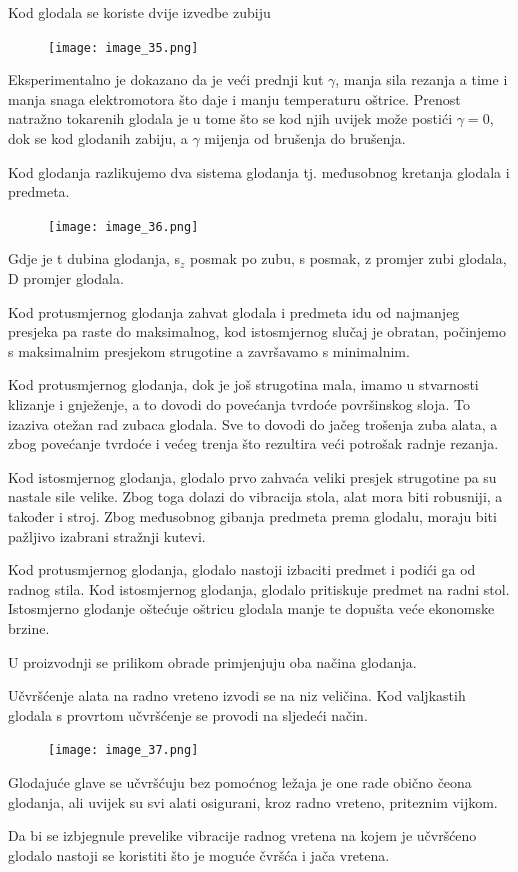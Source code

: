 \documentclass[a4paper,12pt]{article}
\numberwithin{figure}{section}
\begin{document}
\clearpage
Kod glodala se koriste dvije izvedbe zubiju
\begin{figure}[!h]
\centering
\texttt{[image: image\_35.png]}
\end{figure}
\FloatBarrier
Eksperimentalno je dokazano da je veći prednji kut $\gamma$, manja sila rezanja a time i manja snaga elektromotora što daje i manju temperaturu oštrice. Prenost natražno tokarenih glodala je u tome što se kod njih uvijek može postići $\gamma = 0$, dok se kod glodanih zabiju, a $\gamma$ mijenja od brušenja do brušenja.\par
Kod glodanja razlikujemo dva sistema glodanja tj. međusobnog kretanja glodala i predmeta.
\begin{figure}[!h]
\centering
\texttt{[image: image\_36.png]}
\end{figure}
\FloatBarrier
Gdje je t dubina glodanja, s$_{z}$ posmak po zubu, s posmak, z promjer zubi glodala, D promjer glodala. \par
Kod protusmjernog glodanja zahvat glodala i predmeta idu od najmanjeg presjeka pa raste do maksimalnog, kod istosmjernog slučaj je obratan, počinjemo s maksimalnim presjekom strugotine a završavamo s minimalnim.\par
Kod  protusmjernog glodanja, dok je još strugotina mala, imamo u stvarnosti klizanje i gnježenje, a to dovodi do povećanja tvrdoće površinskog sloja. To izaziva otežan rad zubaca glodala. Sve to dovodi do jačeg trošenja zuba alata, a zbog povećanje tvrdoće i većeg trenja što rezultira veći potrošak radnje rezanja.\par
Kod istosmjernog glodanja, glodalo prvo zahvaća veliki presjek strugotine pa su nastale sile velike. Zbog toga
dolazi do vibracija stola, alat mora biti robusniji, a također i stroj. Zbog međusobnog gibanja predmeta prema glodalu, moraju biti pažljivo izabrani stražnji kutevi. \par
Kod protusmjernog glodanja, glodalo nastoji izbaciti predmet i podići ga od radnog stila. Kod istosmjernog glodanja, glodalo pritiskuje predmet na radni stol. Istosmjerno glodanje oštećuje oštricu glodala manje te dopušta veće ekonomske brzine.\par
U proizvodnji se prilikom obrade primjenjuju oba načina glodanja.\par
Učvršćenje alata na radno vreteno izvodi se na niz veličina. Kod valjkastih glodala s provrtom učvršćenje se provodi na sljedeći način.
\begin{figure}[!h]
\centering
\texttt{[image: image\_37.png]}
\end{figure}
\FloatBarrier
Glodajuće glave se učvršćuju bez pomoćnog ležaja je one rade obično čeona glodanja, ali uvijek su svi alati osigurani, kroz radno vreteno, priteznim vijkom.\par
Da bi se izbjegnule prevelike vibracije radnog vretena na kojem je učvršćeno glodalo nastoji se koristiti što je moguće čvršća i jača vretena.
\end{document}
